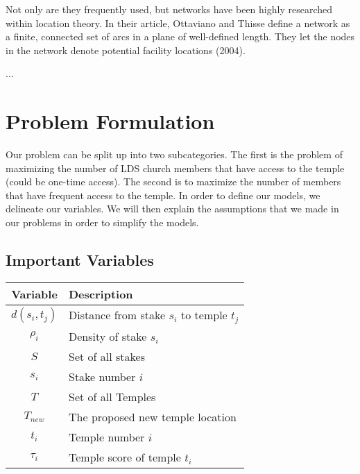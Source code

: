 \documentclass[twoside,twocolumn]{article}
\begin{document}
Not only are they frequently used, but networks have been highly researched within location theory.
In their article, Ottaviano and Thisse define a network as a finite, connected set of arcs in a plane of well-defined length.
They let the nodes in the network denote potential facility locations (2004).


...

\section{Problem Formulation}
\label{sec:prob}

Our problem can be split up into two subcategories. 
The first is the problem of maximizing the number of LDS church members that have access to the temple (could be one-time access).
The second is to maximize the number of members that have frequent access to the temple.
In order to define our models, we delineate our variables.
We will then explain the assumptions that we made in our problems in order to simplify the models.

\subsection{Important Variables}
\begin{tabular}{c | l}
Variable & Description\\
\hline
$d(s_{i},t_{j})$ & Distance from stake $s_{i}$ to temple $t_{j}$\\
$\rho_{i}$ & Density of stake $s_{i}$\\
$S$ & Set of all stakes\\
$s_{i}$ & Stake number $i$\\
$T$ & Set of all Temples\\
$T_{new}$ & The proposed new temple location\\
$t_{i}$ & Temple number $i$ \\
$\tau_{i}$ & Temple score of temple $t_{i}$\\
\end{tabular}
\vspace{0.1in}
\end{document}
